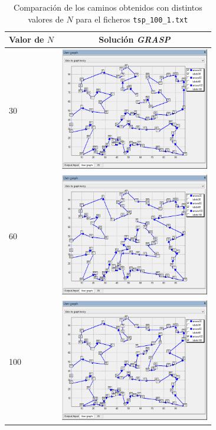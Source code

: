 \documentclass[a4paper,11pt]{article}
\begin{document}
\begin{table}[!htbp]
\label{images_100}
\centering
\begin{tabular}{|p{2cm}|c|}
\hline
Valor de $N$	& Solución \textit{GRASP}	\\ \hline
30 & \includegraphics[width=6.5cm]{images//grasp_100_1_n30.png}	\\ \hline
60 & \includegraphics[width=6.5cm]{images/grasp_100_1_n60.png}	\\ \hline
100 & \includegraphics[width=6.5cm]{images/grasp_100_1_n100.png}	\\ \hline
\end{tabular}
\caption{Comparación de los caminos obtenidos con distintos valores de ${N}$ para el ficheros \texttt{tsp\_100\_1.txt}}
\end{table}
\end{document}
